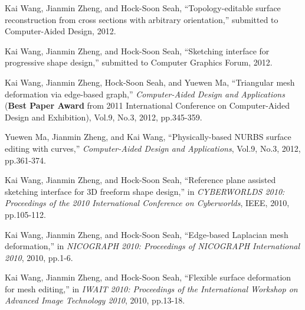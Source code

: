 \begin{enumerate}[ {[}1{]} ]

\item Kai Wang, Jianmin Zheng, and Hock-Soon Seah,
``Topology-editable surface reconstruction from cross sections with
arbitrary orientation,'' submitted to Computer-Aided Design, 2012.

\item Kai Wang, Jianmin Zheng, and Hock-Soon Seah,
``Sketching interface for progressive shape design,'' submitted to
Computer Graphics Forum, 2012.

\item Kai Wang, Jianmin Zheng, Hock-Soon Seah, and Yuewen
Ma, ``Triangular mesh deformation via edge-based graph,''
\emph{Computer-Aided Design and Applications} ({\bf Best Paper
Award} from 2011 International Conference on Computer-Aided Design
and Exhibition), Vol.9, No.3, 2012, pp.345-359.

\item Yuewen Ma, Jianmin Zheng, and Kai Wang,
``Physically-based NURBS surface editing with curves,''
\emph{Computer-Aided Design and Applications}, Vol.9, No.3, 2012,
pp.361-374.

\item Kai Wang, Jianmin Zheng, and Hock-Soon Seah,
``Reference plane assisted sketching interface for 3D freeform shape
design,'' in \emph{CYBERWORLDS 2010: Proceedings of the 2010
International Conference on Cyberworlds}, IEEE, 2010, pp.105-112.

\item Kai Wang, Jianmin Zheng, and Hock-Soon Seah,
``Edge-based Laplacian mesh deformation,'' in \emph{NICOGRAPH 2010:
Proceedings of NICOGRAPH International 2010}, 2010, pp.1-6.

\item Kai Wang, Jianmin Zheng, and Hock-Soon Seah,
``Flexible surface deformation for mesh editing,'' in \emph{IWAIT
2010: Proceedings of the International Workshop on Advanced Image
Technology 2010}, 2010, pp.13-18.

\end{enumerate}
